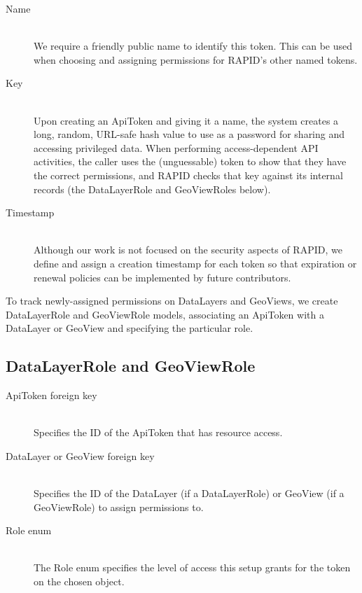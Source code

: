 \begin{description}
\item[Name] \hfill \\
We require a friendly public name to identify this token. This can be used when choosing and assigning permissions for RAPID's other named tokens.

\item[Key] \hfill \\
Upon creating an ApiToken and giving it a name, the system creates a long, random, URL-safe hash value to use as a password for sharing and accessing privileged data. When performing access-dependent API activities, the caller uses the (unguessable) token to show that they have the correct permissions, and RAPID checks that key against its internal records (the DataLayerRole and GeoViewRoles below).

\item[Timestamp] \hfill \\
Although our work is not focused on the security aspects of RAPID, we define and assign a creation timestamp for each token so that expiration or renewal policies can be implemented by future contributors.

\end{description}
To track newly-assigned permissions on DataLayers and GeoViews, we create DataLayerRole and GeoViewRole models, associating an ApiToken with a DataLayer or GeoView and specifying the particular role.

\subsection{DataLayerRole and GeoViewRole}
\begin{description}
\item[ApiToken foreign key] \hfill \\
Specifies the ID of the ApiToken that has resource access.

\item[DataLayer or GeoView foreign key] \hfill \\
Specifies the ID of the DataLayer (if a DataLayerRole) or GeoView (if a GeoViewRole) to assign permissions to.

\item[Role enum] \hfill \\
The Role enum specifies the level of access this setup grants for the token on the chosen object.
\end{description}

